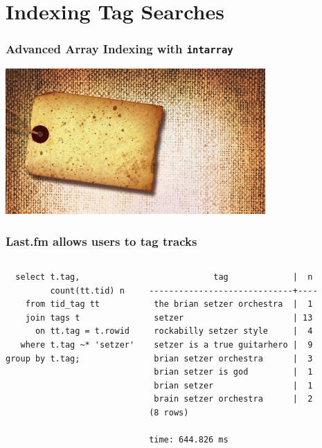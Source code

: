 \documentclass{beamer}
\begin{document}
\section{Indexing Tag Searches}

\begin{frame}[fragile]
  \frametitle{Advanced Array Indexing with \texttt{intarray}}

\begin{center}
  \includegraphics[height=15em]{wordpres-seo-categories-tags.jpg}
\end{center}
\end{frame}

\begin{frame}[fragile]
  \frametitle{Last.fm allows users to tag tracks}

\begin{columns}
\begin{verbatim}
  select t.tag,
         count(tt.tid) n
    from tid_tag tt
    join tags t
      on tt.tag = t.rowid
   where t.tag ~* 'setzer'
group by t.tag;
\end{verbatim}  
\begin{verbatim}
             tag             |  n 
-----------------------------+----
 the brian setzer orchestra  |  1
 setzer                      | 13
 rockabilly setzer style     |  4
 setzer is a true guitarhero |  9
 brian setzer orchestra      |  3
 brian setzer is god         |  1
 brian setzer                |  1
 brain setzer orchestra      |  2
(8 rows)

time: 644.826 ms
\end{verbatim}  
\end{columns}
\end{frame}
\end{document}
